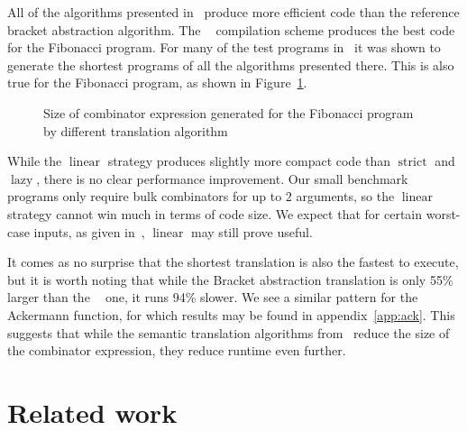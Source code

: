 \documentclass[conference]{IEEEtran}
\DeclareMathOperator{\strict}{strict}
\DeclareMathOperator{\lazy}{lazy}
\DeclareMathOperator{\lazyeta}{lazy_\eta}
\DeclareMathOperator{\linear}{linear}
\begin{document}
All of the algorithms presented in~\cite{kiselyov_lambda_2018} produce more efficient code than the reference bracket abstraction algorithm.
The $\lazyeta$ compilation scheme produces the best code for the Fibonacci program.
For many of the test programs in~\cite{kiselyov_lambda_2018} it was shown to generate the shortest programs of all the algorithms presented there.
This is also true for the Fibonacci program, as shown in Figure~\ref{fig:fib-sizes}.

\begin{figure}
    \centering
    \caption{Size of combinator expression generated for the Fibonacci program by different translation algorithm}
    \label{fig:fib-sizes}
\end{figure}

While the $\linear$ strategy produces slightly more compact code than $\strict$ and $\lazy$, there is no clear performance improvement.
Our small benchmark programs only require bulk combinators for up to $2$ arguments, so the $\linear$ strategy cannot win much in terms of code size.
We expect that for certain worst-case inputs, as given in~\cite{kiselyov_lambda_2018}, $\linear$ may still prove useful.

It comes as no surprise that the shortest translation is also the fastest to execute, but it is worth noting that while the Bracket abstraction translation is only 55\% larger than the $\lazyeta$ one, it runs 94\% slower.
We see a similar pattern for the Ackermann function, for which results may be found in appendix~\ref{app:ack}.
This suggests that while the semantic translation algorithms from~\cite{kiselyov_lambda_2018} reduce the size of the combinator expression, they reduce runtime even further.

\section{Related work}
\end{document}

